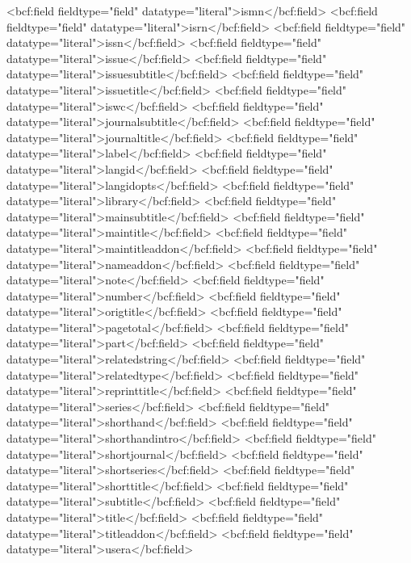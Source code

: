       <bcf:field fieldtype="field" datatype="literal">ismn</bcf:field>
      <bcf:field fieldtype="field" datatype="literal">isrn</bcf:field>
      <bcf:field fieldtype="field" datatype="literal">issn</bcf:field>
      <bcf:field fieldtype="field" datatype="literal">issue</bcf:field>
      <bcf:field fieldtype="field" datatype="literal">issuesubtitle</bcf:field>
      <bcf:field fieldtype="field" datatype="literal">issuetitle</bcf:field>
      <bcf:field fieldtype="field" datatype="literal">iswc</bcf:field>
      <bcf:field fieldtype="field" datatype="literal">journalsubtitle</bcf:field>
      <bcf:field fieldtype="field" datatype="literal">journaltitle</bcf:field>
      <bcf:field fieldtype="field" datatype="literal">label</bcf:field>
      <bcf:field fieldtype="field" datatype="literal">langid</bcf:field>
      <bcf:field fieldtype="field" datatype="literal">langidopts</bcf:field>
      <bcf:field fieldtype="field" datatype="literal">library</bcf:field>
      <bcf:field fieldtype="field" datatype="literal">mainsubtitle</bcf:field>
      <bcf:field fieldtype="field" datatype="literal">maintitle</bcf:field>
      <bcf:field fieldtype="field" datatype="literal">maintitleaddon</bcf:field>
      <bcf:field fieldtype="field" datatype="literal">nameaddon</bcf:field>
      <bcf:field fieldtype="field" datatype="literal">note</bcf:field>
      <bcf:field fieldtype="field" datatype="literal">number</bcf:field>
      <bcf:field fieldtype="field" datatype="literal">origtitle</bcf:field>
      <bcf:field fieldtype="field" datatype="literal">pagetotal</bcf:field>
      <bcf:field fieldtype="field" datatype="literal">part</bcf:field>
      <bcf:field fieldtype="field" datatype="literal">relatedstring</bcf:field>
      <bcf:field fieldtype="field" datatype="literal">relatedtype</bcf:field>
      <bcf:field fieldtype="field" datatype="literal">reprinttitle</bcf:field>
      <bcf:field fieldtype="field" datatype="literal">series</bcf:field>
      <bcf:field fieldtype="field" datatype="literal">shorthand</bcf:field>
      <bcf:field fieldtype="field" datatype="literal">shorthandintro</bcf:field>
      <bcf:field fieldtype="field" datatype="literal">shortjournal</bcf:field>
      <bcf:field fieldtype="field" datatype="literal">shortseries</bcf:field>
      <bcf:field fieldtype="field" datatype="literal">shorttitle</bcf:field>
      <bcf:field fieldtype="field" datatype="literal">subtitle</bcf:field>
      <bcf:field fieldtype="field" datatype="literal">title</bcf:field>
      <bcf:field fieldtype="field" datatype="literal">titleaddon</bcf:field>
      <bcf:field fieldtype="field" datatype="literal">usera</bcf:field>
